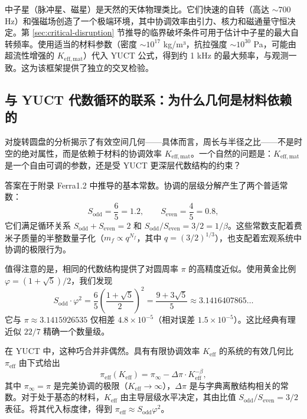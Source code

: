 \documentclass[12pt,a4paper]{article}
\begin{document}
	中子星（脉冲星、磁星）是天然的天体物理类比。它们快速的自转（高达 \(\sim 700\) Hz）和强磁场创造了一个极端环境，其中协调效率由引力、核力和磁通量守恒决定。第 \ref{sec:critical-disruption} 节推导的临界破坏条件可用于估计中子星的最大自转频率。使用适当的材料参数（密度 \(\sim 10^{17}\) kg/m³，抗拉强度 \(\sim 10^{30}\) Pa，可能由超流性增强的 \(K_{\mathrm{eff,mat}}\)）代入 YUCT 公式，得到约 1 kHz 的最大频率，与观测一致。这为该框架提供了独立的交叉检验。
	
	\subsection{与 YUCT 代数循环的联系：为什么几何是材料依赖的}
	\label{subsec:ehrenfest-algebraic-loop}
	
	对旋转圆盘的分析揭示了有效空间几何——具体而言，周长与半径之比——不是时空的绝对属性，而是依赖于材料的协调效率 \(K_{\mathrm{eff,mat}}\)。一个自然的问题是：\(K_{\mathrm{eff,mat}}\) 是一个自由可调的参数，还是受 YUCT 更深层代数结构的约束？
	
	答案在于附录 Ferra1.2 中推导的基本常数。协调的层级分解产生了两个普适常数：
	\[
	S_{\mathrm{odd}} = \frac{6}{5} = 1.2,\qquad S_{\mathrm{even}} = \frac{4}{5} = 0.8,
	\]
	它们满足循环关系 \(S_{\mathrm{odd}}+S_{\mathrm{even}}=2\) 和 \(S_{\mathrm{odd}}/S_{\mathrm{even}} = 3/2 = 1/\beta\)。这些常数支配着费米子质量的半整数量子化（\(m_f \propto q^{N_f}\)，其中 \(q = (3/2)^{1/3}\)），也支配着宏观系统中协调的极限行为。
	
	值得注意的是，相同的代数结构提供了对圆周率 \(\pi\) 的高精度近似。使用黄金比例 \(\varphi = (1+\sqrt{5})/2\)，我们发现
	\begin{equation}
		S_{\mathrm{odd}} \cdot \varphi^2 = \frac{6}{5} \left( \frac{1+\sqrt{5}}{2} \right)^2 
		= \frac{9+3\sqrt{5}}{5} \approx 3.1416407865\dots
	\end{equation}
	它与 \(\pi \approx 3.1415926535\) 仅相差 \(4.8\times10^{-5}\)（相对误差 \(1.5\times10^{-5}\)）。这比经典有理近似 \(22/7\) 精确一个数量级。
	
	在 YUCT 中，这种巧合并非偶然。具有有限协调效率 \(K_{\mathrm{eff}}\) 的系统的有效几何比 \(\pi_{\mathrm{eff}}\) 由下式给出
	\begin{equation}
		\pi_{\mathrm{eff}}(K_{\mathrm{eff}}) = \pi_{\infty} - \Delta\pi \cdot K_{\mathrm{eff}}^{-\beta},
	\end{equation}
	其中 \(\pi_{\infty} = \pi\) 是完美协调的极限（\(K_{\mathrm{eff}} \to \infty\)），\(\Delta\pi\) 是与字典离散结构相关的常数。对于处于基态的材料，\(K_{\mathrm{eff}}\) 由主导层级水平决定，其由比值 \(S_{\mathrm{odd}}/S_{\mathrm{even}} = 3/2\) 表征。将其代入标度律，得到 \(\pi_{\mathrm{eff}} \approx S_{\mathrm{odd}}\varphi^2\)。
	
\end{document}
